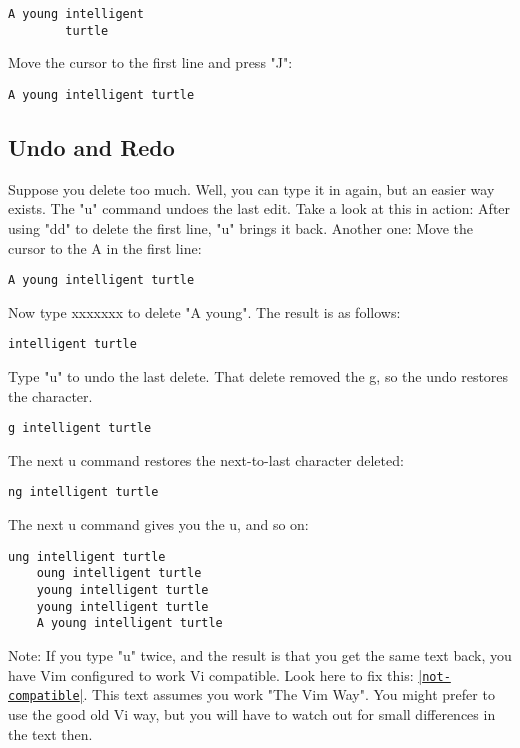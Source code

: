		\begin{Verbatim}[samepage=true]
		A young intelligent 
		turtle 
		\end{Verbatim}

Move the cursor to the first line and press "J":

		\begin{Verbatim}[samepage=true]
		A young intelligent turtle 
		\end{Verbatim}

\subsection{Undo and Redo}
\label{Undo and Redo}

Suppose you delete too much.
Well, you can type it in again, but an easier way exists.
The "u" command undoes the last edit.
Take a look at this in action: After using "dd" to delete the first line, "u" brings it back.
Another one: Move the cursor to the A in the first line: 

		\begin{Verbatim}[samepage=true]
		A young intelligent turtle 
						\end{Verbatim}

Now type xxxxxxx to delete "A young".
The result is as follows: 

	\begin{Verbatim}[samepage=true]
	intelligent turtle 
	\end{Verbatim}

Type "u" to undo the last delete.
That delete removed the g, so the undo restores the character.

	\begin{Verbatim}[samepage=true]
	g intelligent turtle 
	\end{Verbatim}

The next u command restores the next-to-last character deleted:

	\begin{Verbatim}[samepage=true]
	ng intelligent turtle 
	\end{Verbatim}

The next u command gives you the u, and so on:

	\begin{Verbatim}[samepage=true]
	ung intelligent turtle 
	oung intelligent turtle 
	young intelligent turtle 
	young intelligent turtle 
	A young intelligent turtle 
	\end{Verbatim}

Note:
If you type "u" twice, and the result is that you get the same text back, you have Vim configured to work Vi compatible.
Look here to fix this: \hyperref[not-compatible]{|\texttt{not-compatible}|}.
This text assumes you work "The Vim Way".
You might prefer to use the good old Vi way, but you will have to watch out for small differences in the text then.

